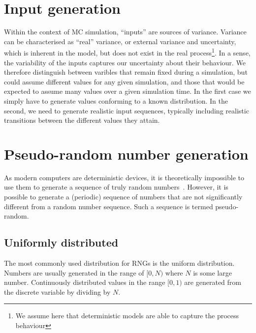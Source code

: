 \section{Input generation}
Within the context of MC simulation, ``inputs'' are sources of variance.
Variance can be characterised as ``real'' variance, or external variance and uncertainty, which is inherent in the model, but does not exist in the real process\footnote{We assume here that deterministic models are able to capture the
process behaviour}.
In a sense, the variability of the inputs captures our uncertainty about their behaviour.
We therefore distinguish between varibles that remain fixed during a simulation, but could assume different values for any given simulation, and those that would be expected to assume many values over a given simulation time.
In the first case we simply have to generate values conforming to a known distribution.
In the second, we need to generate realistic input sequences, typically including realistic transitions between the different values they attain.


\section{Pseudo-random number generation}

As modern computers are deterministic devices, it is theoretically impossible to use them to generate a sequence of truly random numbers~\citep{neumann1951various}.
However, it is possible to generate a (periodic) sequence of numbers that are not significantly different from a random number sequence.
Such a sequence is termed pseudo-random.


\subsection{Uniformly distributed}
The most commonly used distribution for RNGs is the uniform distribution.
Numbers are usually generated in the range of $[0, N)$ where $N$ is some large number.
Continuously distributed values in the range $[0,1)$ are generated from the discrete variable by dividing by $N$.

